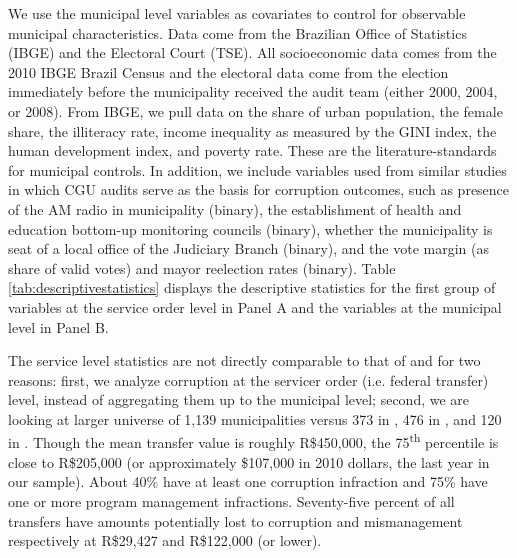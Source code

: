 \documentclass[11pt]{article}
\begin{document}
We use the municipal level variables as covariates to control for observable municipal characteristics. Data come from the Brazilian Office of Statistics (IBGE) and the Electoral Court (TSE). All socioeconomic data comes from the 2010 IBGE Brazil Census and the electoral data come from the election immediately before the municipality received the audit team (either 2000, 2004, or 2008). From IBGE, we pull data on the share of urban population, the female share, the illiteracy rate, income inequality as measured by the GINI index, the human development index, and poverty rate. These are the literature-standards for municipal controls. In addition, we include variables used from similar studies in which CGU audits serve as the basis for corruption outcomes, such as presence of the AM radio in municipality (binary), the establishment of health and education bottom-up monitoring councils (binary), whether the municipality is seat of a local office of the Judiciary Branch (binary), and the vote margin (as share of valid votes) and mayor reelection rates (binary). Table \ref{tab:descriptivestatistics} displays the descriptive statistics for the first group of variables at the service order level in Panel A and the variables at the municipal level in Panel B.

The service level statistics are not directly comparable to that of \citet{FerrazExposingCorruptPoliticians2008b,FerrazElectoralAccountabilityCorruption2011a} and \citet{ZamboniAuditRiskRent2018} for two reasons: first, we analyze corruption at the servicer order (i.e. federal transfer) level, instead of aggregating them up to the municipal level; second, we are looking at larger universe of 1,139 municipalities versus 373 in \citet{FerrazExposingCorruptPoliticians2008b}, 476 in \citet{FerrazElectoralAccountabilityCorruption2011a}, and 120 in \citet{ZamboniAuditRiskRent2018}. Though the mean transfer value is roughly R\$450,000, the 75\textsuperscript{th} percentile is close to R\$205,000 (or approximately \$107,000 in 2010 dollars, the last year in our sample). About 40\% have at least one corruption infraction and 75\% have one or more program management infractions. Seventy-five percent of all transfers have amounts potentially lost to corruption and mismanagement respectively at R\$29,427 and R\$122,000 (or lower).


\end{document}
